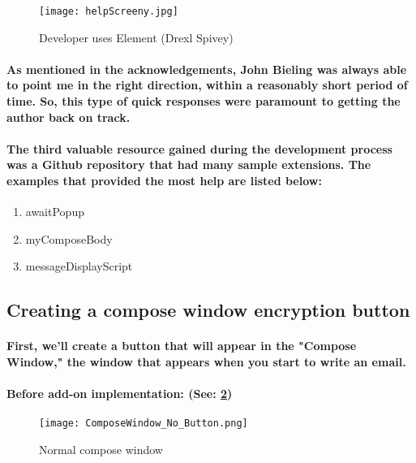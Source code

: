 \begin{figure}[H]
\centering
\texttt{[image: helpScreeny.jpg]}
\caption{\label{fig: helpScreeny} Developer uses Element (Drexl Spivey)}
\end{figure}

\paragraph{As mentioned in the acknowledgements, John Bieling was always able to point me in the right direction, within a reasonably short period of time. So, this type of quick responses were paramount to getting the author back on track.}

\paragraph{The third valuable resource gained during the development process was a Github repository that had many sample extensions. The examples that provided the most help are listed below:}\cite[Website]{Bieling}

\begin{enumerate}
\item awaitPopup
\item myComposeBody
\item messageDisplayScript
\end{enumerate}


\subsection{Creating a compose window encryption button}

\paragraph{First, we'll create a button that will appear in the "Compose Window," the window that appears when you start to write an email.}

\paragraph{Before add-on implementation: (See: \ref{fig: noButton})}

\begin{figure}[H]
    \centering
    \texttt{[image: ComposeWindow\_No\_Button.png]}
    \caption{\label{fig: noButton} Normal compose window}
\end{figure}

